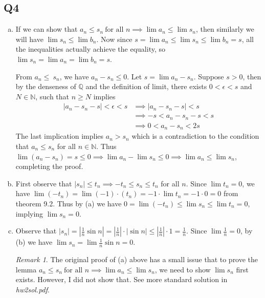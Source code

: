 \documentclass[12pt,lettersize]{article}
\theoremstyle{remark}
\newtheorem*{rem}{Remark}
\newcommand{\Q}{\mathbb{Q}}
\newcommand{\N}{\mathbb{N}}
\begin{document}
\subsection*{Q4}
\begin{enumerate}[(a)]
	\item If we can show that $a_n\leq s_n\ \text{for all $n$}\implies \lim a_n\leq\lim s_n$, then similarly we will have $\lim s_n\leq\lim b_n$. Now since $s=\lim a_n\leq\lim s_n\leq\lim b_n=s$, all the inequalities actually achieve the equality, so $\lim s_n=\lim a_n=\lim b_n=s$.
	
	From $a_n\leq\ s_n$, we have $a_n-s_n\leq 0$. Let $s=\lim a_n-s_n$. Suppose $s>0$, then by the denseness of $\Q$ and the definition of limit, there exists $0<\epsilon<s$ and $N\in\N$, such that $n\geq N$ implies
	\begin{align*}
		|a_n-s_n-s|<\epsilon<s &\implies |a_n-s_n-s|<s\\
							   &\implies -s<a_n-s_n-s<s\\
							   &\implies 0<a_n-s_n<2s
	\end{align*}
	The last implication implies $a_n>s_n$ which is a contradiction to the condition that $a_n\leq s_n$ for all $n\in\N$. Thus $\lim (a_n-s_n)=s\leq 0\implies \lim a_n - \lim s_n\leq 0 \implies \lim a_n\leq\lim s_n$, completing the proof.
	\item First observe that $|s_n|\leq t_n\implies -t_n\leq s_n\leq t_n$ for all $n$. Since $\lim t_n=0$, we have $\lim(-t_n)=\lim(-1)\cdot(t_n)=-1\cdot\lim t_n=-1\cdot0=0$ from theorem 9.2. Thus by (a) we have $0=\lim(-t_n)\leq\lim s_n\leq\lim t_n=0$, implying $\lim s_n=0$.
	\item Observe that $|s_n|=|\frac{1}{n}\sin n|=|\frac{1}{n}|\cdot|\sin n|\leq|\frac{1}{n}|\cdot1=\frac{1}{n}$. Since $\lim \frac{1}{n}=0$, by (b) we have $\lim s_n=\lim\frac{1}{n}\sin n=0$.\bigskip
	\begin{rem}
		The original proof of (a) above has a small issue that to prove the lemma $a_n\leq s_n\ \text{for all $n$}\implies \lim a_n\leq\lim s_n$, we need to show $\lim s_n$ first exists. However, I did not show that. See more standard solution in \emph{hw2sol.pdf}.
	\end{rem}
\end{enumerate}
\newpage
\end{document}
